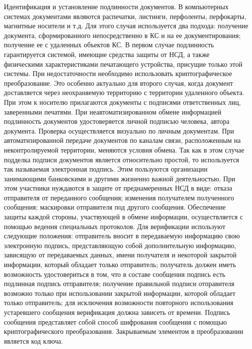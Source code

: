 \documentclass[a4paper,12pt]{extarticle}
\begin{document}
	Идентификация и установление подлинности документов. 
	В компьютерных системах документами являются распечатки, листинги, перфоленты, перфокарты, магнитные носители и т.д. Для этого случая используется два подхода:
	 получение документа, сформированного непосредственно в КС и на ее документирования;
	 получение ее с удаленных объектов КС.
	В первом случае подлинность гарантируется системой, имеющие средства защиты от НСД, а также физическими характеристиками печатающего устройства, присущие только этой системы. При недостаточности необходимо использовать криптографическое преобразование. Это особенно актуально для второго случая, когда документ доставляется через неохраняемую территорию с территории удаленного объекта. При этом к носителю прилагаются документы с подписями ответственных лиц, заверенными печатями.
	При неавтоматизированном обмене информацией подлинность документов удостоверяется личной подписью человека, автора документа. Проверка осуществляется визуально по личным документам.
	При автоматизированной передаче документов по каналам связи, расположенным на неконтролируемой территории, меняются условия обмена. Так как в этом случае подделка подписи документов является относительно простой, то используется так называемая электронная подпись. Этим пользуются организации занимающими банковскими и другими жизненно важной деятельностью. При этом участники нуждаются в защите от преднамеренных НСД в виде:
	 отказа отправителя от переданного сообщения;
	 изменения получателем полученного сообщения;
	 маскировки отправителя под другого сообщения.
	Обеспечение защиты каждой стороны, участвующей в обмене информации, осуществляется с помощью ведения специальных протоколов. Для верификации используют следующие положения:
	 отправитель вносит в передаваемую информацию свою электронную подпись, представляющую собой дополнительную информацию, зависящую от передаваемых данных, имени получателя и некоторой закрытой информации, который обладает только отправитель;
	 получатель должен иметь возможность удостовериться в том, что в составе сообщения подпись есть подлинная подпись отправителя;
	 получение правильной подписи отправителя возможно только при использовании закрытой информации, которой обладает только отправитель;
	 для исключения возможности повторного использования устаревшего сообщения верификация должна зависеть от времени.
	Подпись сообщения представляет собой способ шифрования сообщения с помощью криптографического преобразования. Закрываемым элементом в преобразовании является код ключа.
\end{document}
